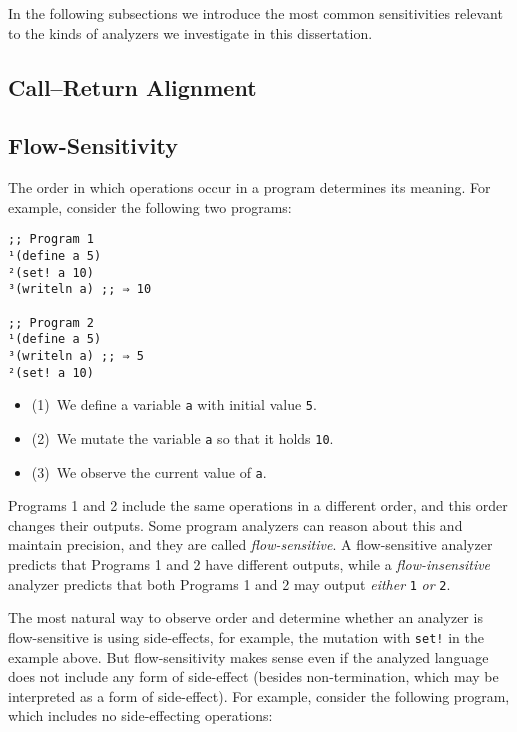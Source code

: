 \documentclass[12pt, oneside]{book}
\begin{document}
In the following subsections we introduce the most common sensitivities relevant to the kinds of analyzers we investigate in this dissertation.

\subsection{Call–Return Alignment}

\subsection{Flow-Sensitivity}
\label{section:flow-sensitivity}

The order in which operations occur in a program determines its meaning. For example, consider the following two programs:

\begin{Verbatim}
;; Program 1
¹(define a 5)
²(set! a 10)
³(writeln a) ;; ⇒ 10

;; Program 2
¹(define a 5)
³(writeln a) ;; ⇒ 5
²(set! a 10)
\end{Verbatim}

\begin{itemize}
  \item (1)~We define a variable \texttt{a} with initial value \texttt{5}.
  \item (2)~We mutate the variable \texttt{a} so that it holds \texttt{10}.
  \item (3)~We observe the current value of \texttt{a}.
\end{itemize}

Programs 1 and 2 include the same operations in a different order, and this order changes their outputs. Some program analyzers can reason about this and maintain precision, and they are called \emph{flow-sensitive}. A flow-sensitive analyzer predicts that Programs 1 and 2 have different outputs, while a \emph{flow-insensitive} analyzer predicts that both Programs 1 and 2 may output \emph{either} \texttt{1} \emph{or} \texttt{2}.

The most natural way to observe order and determine whether an analyzer is flow-sensitive is using side-effects, for example, the mutation with \texttt{set!} in the example above. But flow-sensitivity makes sense even if the analyzed language does not include any form of side-effect (besides non-termination, which may be interpreted as a form of side-effect). For example, consider the following program, which includes no side-effecting operations:
\end{document}
